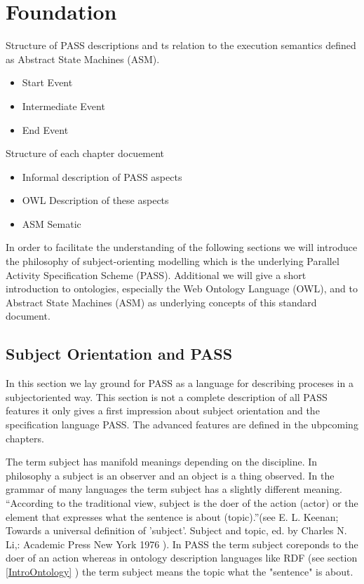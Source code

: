 \chapter{Foundation}

Structure of PASS descriptions and ts relation to the execution semantics defined as Abstract State Machines (ASM).

\begin{itemize}
	\item Start Event
	\item Intermediate Event
	\item End Event
\end{itemize}

Structure of each chapter docuement

\begin{itemize}
	\item Informal description of PASS aspects
	\item OWL Description of these aspects
	\item ASM Sematic
\end{itemize}

In order to facilitate the understanding of the following sections we will introduce the philosophy of subject-orienting modelling which is the underlying Parallel Activity Specification Scheme (PASS). Additional we will give a short introduction to ontologies, especially the Web Ontology Language (OWL), and to Abstract State Machines (ASM) as underlying concepts of this standard document.

\section{Subject Orientation and PASS }
\label{SubjectOrient}


In this section we lay ground for PASS as a language for describing proceses in a subjectoriented way. This section is not a complete description of all PASS features it only gives a first impression about subject orientation and the specification language PASS. The advanced features are defined in the ubpcoming chapters.

The term subject has manifold meanings depending on the discipline. In philosophy a subject is an observer and an object is a thing observed. In the grammar of many languages the term subject has a slightly different meaning. “According to the traditional view, subject is the doer of the action (actor) or the element that expresses what the sentence is about (topic).”(see E. L. Keenan; Towards a universal definition of 'subject'. Subject and topic, ed. by  Charles N. Li,: Academic Press New York 1976 ). In PASS the term subject coreponds to the doer of an action whereas in ontology description languages like RDF (see section \ref{IntroOntology} ) the term subject means the topic what the "sentence" is about.

